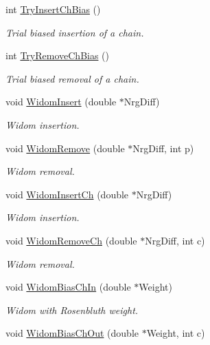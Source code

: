\begin{DoxyCompactItemize}
int \hyperlink{classForces_a949d9de0a157e4258f88d5b5f322f74e}{\-Try\-Insert\-Ch\-Bias} ()
\begin{DoxyCompactList}\small\item\em \-Trial biased insertion of a chain. \end{DoxyCompactList}\item 
int \hyperlink{classForces_a32c3f4b656bce2cf73370ce605f53113}{\-Try\-Remove\-Ch\-Bias} ()
\begin{DoxyCompactList}\small\item\em \-Trial biased removal of a chain. \end{DoxyCompactList}\item 
void \hyperlink{classForces_af9eda9a781eabd31a8813c9a64f2d5ec}{\-Widom\-Insert} (double $\ast$\-Nrg\-Diff)
\begin{DoxyCompactList}\small\item\em \-Widom insertion. \end{DoxyCompactList}\item 
void \hyperlink{classForces_a85d825b7b4af29d476abbf098ce630e3}{\-Widom\-Remove} (double $\ast$\-Nrg\-Diff, int p)
\begin{DoxyCompactList}\small\item\em \-Widom removal. \end{DoxyCompactList}\item 
void \hyperlink{classForces_acffb530559d4e3ebfac6481a46468f52}{\-Widom\-Insert\-Ch} (double $\ast$\-Nrg\-Diff)
\begin{DoxyCompactList}\small\item\em \-Widom insertion. \end{DoxyCompactList}\item 
void \hyperlink{classForces_a0ab84cf7b372ab5ae21966ed671ee4c3}{\-Widom\-Remove\-Ch} (double $\ast$\-Nrg\-Diff, int c)
\begin{DoxyCompactList}\small\item\em \-Widom removal. \end{DoxyCompactList}\item 
void \hyperlink{classForces_af07ae7761f13798c6de1391b10c5856d}{\-Widom\-Bias\-Ch\-In} (double $\ast$\-Weight)
\begin{DoxyCompactList}\small\item\em \-Widom with \-Rosenbluth weight. \end{DoxyCompactList}\item 
void \hyperlink{classForces_ab249c91e15e3611167002159ef6d5b60}{\-Widom\-Bias\-Ch\-Out} (double $\ast$\-Weight, int c)

\end{DoxyCompactItemize}
